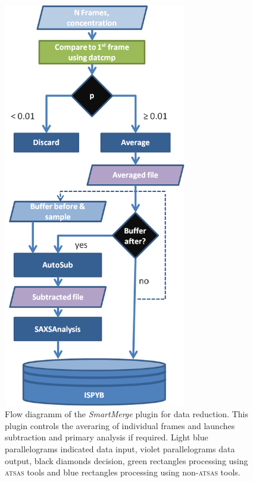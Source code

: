 \documentclass[preprint,pdf]{iucr}              %
\begin{document}
\begin{figure}
\centering
\includegraphics[width=8cm]{smartmerge.png}%
\caption{Flow diagramm of the \textit{SmartMerge} plugin for data reduction.
This plugin controls the averaring of individual frames and launches
subtraction and primary analysis if required.
Light blue parallelograms indicated data input, violet parallelograms data output,
black diamonds decision, green rectangles processing using \textsc{atsas} tools
and blue rectangles processing using non-\textsc{atsas} tools. }
\label{fgr:smart}
\end{figure}
\end{document}
